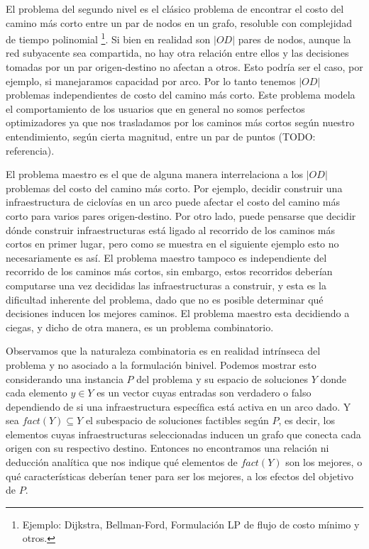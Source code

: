 \documentclass{article}
\begin{document}
  El problema del segundo nivel es el clásico problema de encontrar el costo del camino más corto entre un par de nodos en un grafo, resoluble con complejidad de tiempo polinomial \footnote{Ejemplo: Dijkstra, Bellman-Ford, Formulación LP de flujo de costo mínimo y otros.}. Si bien en realidad son $|OD|$ pares de nodos, aunque la red subyacente sea compartida, no hay otra relación entre ellos y las decisiones tomadas por un par origen-destino no afectan a otros. Esto podría ser el caso, por ejemplo, si manejaramos capacidad por arco. Por lo tanto tenemos $|OD|$ problemas independientes de costo del camino más corto. Este problema modela el comportamiento de los usuarios que en general no somos perfectos optimizadores ya que nos trasladamos por los caminos más cortos según nuestro entendimiento, según cierta magnitud, entre un par de puntos (TODO: referencia).

  El problema maestro es el que de alguna manera interrelaciona a los $|OD|$ problemas del costo del camino más corto. Por ejemplo, decidir construir una infraestructura de ciclovías en un arco puede afectar el costo del camino más corto para varios pares origen-destino. Por otro lado, puede pensarse que decidir dónde construir infraestructuras está ligado al recorrido de los caminos más cortos en primer lugar, pero como se muestra en el siguiente ejemplo esto no necesariamente es así. El problema maestro tampoco es independiente del recorrido de los caminos más cortos, sin embargo, estos recorridos deberían computarse una vez decididas las infraestructuras a construir, y esta es la dificultad inherente del problema, dado que no es posible determinar qué decisiones inducen los mejores caminos. El problema maestro esta decidiendo a ciegas, y dicho de otra manera, es un problema combinatorio.

  Observamos que la naturaleza combinatoria es en realidad intrínseca del problema y no asociado a la formulación binivel. Podemos mostrar esto considerando una instancia $P$ del problema y su espacio de soluciones $Y$ donde cada elemento $y \in Y$ es un vector cuyas entradas son verdadero o falso dependiendo de si una infraestructura específica está activa en un arco dado. Y sea $fact(Y) \subseteq Y$ el subespacio de soluciones factibles según $P$, es decir, los elementos cuyas infraestructuras seleccionadas inducen un grafo que conecta cada origen con su respectivo destino. Entonces no encontramos una relación ni deducción analítica que nos indique qué elementos de $fact(Y)$ son los mejores, o qué características deberían tener para ser los mejores, a los efectos del objetivo de $P$.
\end{document}
